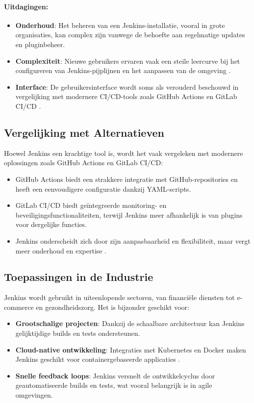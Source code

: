 \paragraph{Uitdagingen:}
\begin{itemize}
    \item \textbf{Onderhoud}: Het beheren van een Jenkins-installatie, vooral in grote organisaties, kan complex zijn vanwege de behoefte aan regelmatige updates en pluginbeheer.
    \item \textbf{Complexiteit}: Nieuwe gebruikers ervaren vaak een steile leercurve bij het configureren van Jenkins-pijplijnen en het aanpassen van de omgeving \autocite{springer2023ci}.
    \item \textbf{Interface}: De gebruikersinterface wordt soms als verouderd beschouwd in vergelijking met modernere CI/CD-tools zoals GitHub Actions en GitLab CI/CD \autocite{springer2023ci}.
\end{itemize}

\subsection{Vergelijking met Alternatieven}

Hoewel Jenkins een krachtige tool is, wordt het vaak vergeleken met modernere oplossingen zoals GitHub Actions en GitLab CI/CD:
\begin{itemize}
    \item GitHub Actions biedt een strakkere integratie met GitHub-repositories en heeft een eenvoudigere configuratie dankzij YAML-scripts.
    \item GitLab CI/CD biedt geïntegreerde monitoring- en beveiligingsfunctionaliteiten, terwijl Jenkins meer afhankelijk is van plugins voor dergelijke functies.
    \item Jenkins onderscheidt zich door zijn aanpasbaarheid en flexibiliteit, maar vergt meer onderhoud en expertise \autocite{shahin2017}.
\end{itemize}

\subsection{Toepassingen in de Industrie}

Jenkins wordt gebruikt in uiteenlopende sectoren, van financiële diensten tot e-commerce en gezondheidszorg. Het is bijzonder geschikt voor:
\begin{itemize}
    \item \textbf{Grootschalige projecten}: Dankzij de schaalbare architectuur kan Jenkins gelijktijdige builds en tests ondersteunen.
    \item \textbf{Cloud-native ontwikkeling}: Integraties met Kubernetes en Docker maken Jenkins geschikt voor containergebaseerde applicaties \autocite{amaral2021}.
    \item \textbf{Snelle feedback loops}: Jenkins versnelt de ontwikkelcyclus door geautomatiseerde builds en tests, wat vooral belangrijk is in agile omgevingen.
\end{itemize}

